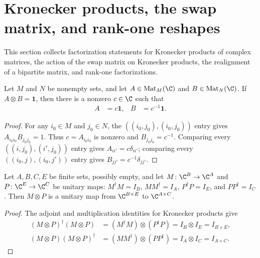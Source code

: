 \section{Kronecker products, the swap matrix, and rank-one reshapes}

This section collects factorization statements for Kronecker products of
complex matrices, the action of the swap matrix on Kronecker products, the
realignment of a bipartite matrix, and rank-one factorizations.

\begin{lemma}
    \label{thm:mpug_kronecker_identity_factors}
    \leanok
    Let $M$ and $N$ be nonempty sets, and let
    $A\in\operatorname{Mat}_M(\C)$ and $B\in\operatorname{Mat}_N(\C)$. If
    $A\otimes B=\mathbf 1$, then there is a nonzero $c\in\C$ such that
    \begin{align}
        A & =c\mathbf 1, & B & =c^{-1}\mathbf 1.
        \label{eq:mpug_kronecker_identity_factors}
    \end{align}
\end{lemma}

\begin{proof}\leanok
    For any $i_0\in M$ and $j_0\in N$, the
    $((i_0,j_0),(i_0,j_0))$ entry gives
    $A_{i_0i_0}B_{j_0j_0}=1$. Thus $c=A_{i_0i_0}$ is nonzero and
    $B_{j_0j_0}=c^{-1}$. Comparing every
    $((i,j_0),(i',j_0))$ entry gives $A_{ii'}=c\delta_{ii'}$; comparing every
    $((i_0,j),(i_0,j'))$ entry gives $B_{jj'}=c^{-1}\delta_{jj'}$.
\end{proof}

\begin{lemma}
    \label{thm:matrix_unitary_between_kronecker}
    \leanok
    Let $A,B,C,E$ be finite sets, possibly empty, and let
    $M\colon\C^B\to\C^A$ and $P\colon\C^E\to\C^C$ be unitary maps:
    $M^\dagger M=I_B$, $MM^\dagger=I_A$, $P^\dagger P=I_E$, and
    $PP^\dagger=I_C$. Then $M\otimes P$ is a unitary map from
    $\C^{B\times E}$ to $\C^{A\times C}$.
\end{lemma}

\begin{proof}\leanok
    The adjoint and multiplication identities for Kronecker products give
    \begin{align}
        (M\otimes P)^\dagger(M\otimes P)
         & =(M^\dagger M)\otimes(P^\dagger P)
        =I_B\otimes I_E=I_{B\times E},        \\
        (M\otimes P)(M\otimes P)^\dagger
         & =(MM^\dagger)\otimes(PP^\dagger)
        =I_A\otimes I_C=I_{A\times C}.
    \end{align}
\end{proof}

